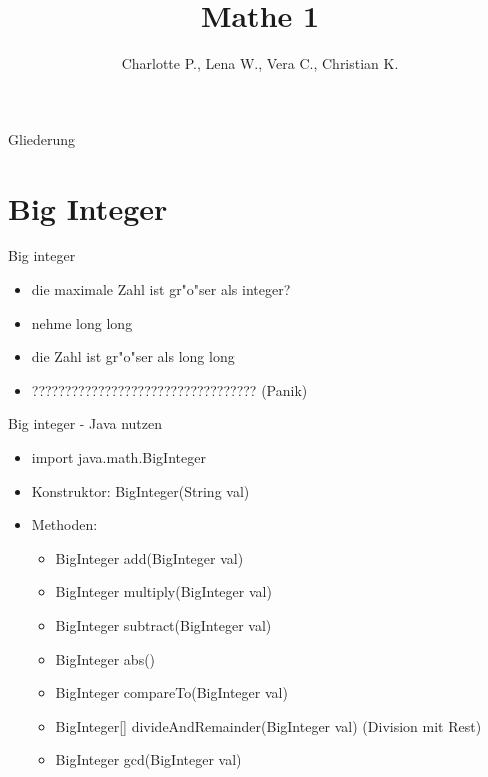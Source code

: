 \documentclass[18pt]{beamer}
\title[Mathe 1]{Mathe 1}
\author{Charlotte P., Lena W., Vera C., Christian K.}
\institute{ITI Wagner \& IPD Tichy}
\begin{document}

\begin{frame}
\titlepage
\end{frame}

\begin{frame}{Gliederung}
\tableofcontents
\end{frame}

\section {Big Integer}
\begin{frame}{Big integer}
\begin {itemize}
\item die maximale Zahl ist gr"o"ser als integer?
 
\item nehme long long

\item die Zahl ist gr"o"ser als long long
 
\item ?????????????????????????????????? (Panik) 
\end {itemize}
\end{frame}

\begin{frame}{Big integer - Java nutzen}
\begin {itemize}
\item import java.math.BigInteger
\item Konstruktor: BigInteger(String val)
\item Methoden:
\begin {itemize}
\item BigInteger add(BigInteger val)
\item BigInteger multiply(BigInteger val)
\item BigInteger subtract(BigInteger val)
\item BigInteger abs()
\item BigInteger compareTo(BigInteger val)
\item BigInteger[]  divideAndRemainder(BigInteger val) (Division mit Rest)
\item BigInteger gcd(BigInteger val)
\end {itemize}
\end {itemize}
\end{frame}
\end{document}
